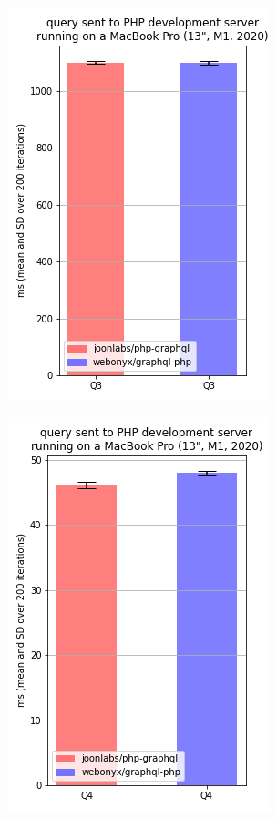\documentclass[11pt, a4paper]{article}
\begin{document}
\begin{figure}
\begin{subfigure}{.5\textwidth}
  \label{localhost_Q2}
\end{subfigure}%
\\
\begin{subfigure}{.5\textwidth}
  \centering
  \includegraphics[width=.75\linewidth]{results/localhost_Q3.png}
  \label{localhost_Q3}
\end{subfigure}%
\begin{subfigure}{.5\textwidth}
  \centering
  \includegraphics[width=.75\linewidth]{results/localhost_Q4.png}

\end{subfigure}
\end{figure}
\end{document}
